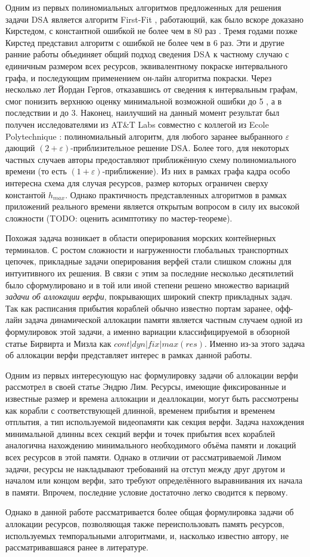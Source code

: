 Одним из первых полиномиальных алгоритмов предложенных для решения задачи DSA является алгоритм First-Fit \cite{chrobak_packing_1988}, работающий, как было вскоре доказано Кирстедом, с константной ошибкой не более чем в 80 раз \cite{kierstead_linearity_1988}.
Тремя годами позже Кирстед представил алгоритм с ошибкой не более чем в 6 раз\cite{kierstead_polynomial_1991}.
Эти и другие ранние работы объединяет общий подход сведения DSA к частному случаю с единичным размером всех ресурсов, эквивалентному покраске интервального графа, и последующим применением он-лайн алгоритма покраски.
Через несколько лет Йордан Гергов, отказавшись от сведения к интервальным графам, смог понизить верхнюю оценку минимальной возможной ошибки до 5 \cite{gergov_approximation_1996}, а в последствии и до 3\cite{gergov_algorithms_1999}.
Наконец, наилучший на данный момент результат был получен исследователями из AT\&T Labs совместно с коллегой из Ecole Polytechnique \cite{buchsbaum_opt_2003}: полиномиальный алгоритм, для любого заранее выбранного $\varepsilon$ дающий $(2+\varepsilon)$-приблизительное решение DSA.
Более того, для некоторых частных случаев авторы предоставляют приближённую схему полиномиального времени (то есть $(1+\varepsilon)$-приближение).
Из них в рамках графа кадра особо интересна схема для случая ресурсов, размер которых ограничен сверху константой $h_{max}$.
Однако практичность представленных алгоритмов в рамках приложений реального времени является открытым вопросом в силу их высокой сложности (TODO: оценить асимптотику по мастер-теореме).

Похожая задача возникает в области оперирования морских контейнерных терминалов.
С ростом сложности и нагруженности глобальных транспортных цепочек, прикладные задачи оперирования верфей стали слишком сложны для интуитивного их решения.
В связи с этим за последние несколько десятилетий было сформулировано и в той или иной степени решено множество вариаций \textit{задачи об аллокации верфи}, покрывающих широкий спектр прикладных задач.
Так как расписания прибытия кораблей обычно известно портам заранее, офф-лайн задача динамической аллокации памяти является частным случаем одной из формулировок этой задачи, а именно вариации классифицируемой в обзорной статье Бирвирта и Мизла\cite{BIERWIRTH2010615} как $cont|dyn|fix|max(res)$.
Именно из-за этого задача об аллокации верфи представляет интерес в рамках данной работы.

Одним из первых интересующую нас формулировку задачи об аллокации верфи рассмотрел в своей статье Эндрю Лим\cite{LIM1998105}.
Ресурсы, имеющие фиксированные и известные размер и времена аллокации и деаллокации, могут быть рассмотрены как корабли с соответствующей длинной, временем прибытия и временем отплытия, а тип используемой видеопамяти как секция верфи.
Задача нахождения минимальной длинны всех секций верфи и точек прибытия всех кораблей аналогична нахождению минимального необходимого объёма памяти и локаций всех ресурсов в этой памяти.
Однако в отличии от рассматриваемой Лимом задачи, ресурсы не накладывают требований на отступ между друг другом и началом или концом верфи, зато требуют определённого выравнивания их начала в памяти.
Впрочем, последние условие достаточно легко сводится к первому.

Однако в данной работе рассматривается более общая формулировка задачи об аллокации ресурсов, позволяющая также переиспользовать память ресурсов, используемых темпоральными алгоритмами, и, насколько известно автору, не рассматривавшаяся ранее в литературе.
